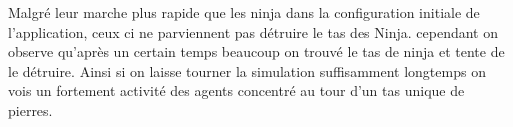 Malgré leur marche plus rapide que les ninja dans la configuration initiale de l'application, ceux ci ne parviennent pas détruire le tas des Ninja. cependant on observe qu'après un certain temps beaucoup on trouvé le tas de ninja et tente de le détruire. Ainsi si on laisse tourner la simulation suffisamment longtemps on vois un fortement activité des agents concentré au tour d'un tas unique de pierres.

